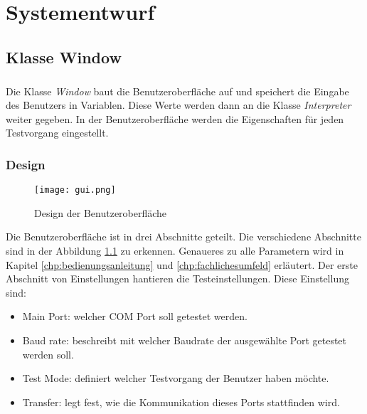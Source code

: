 \chapter{Systementwurf}\label{chp:systementwurf}

\section{Klasse Window}
\paragraph{}
Die Klasse \textit{Window} baut die Benutzeroberfläche auf und speichert die Eingabe des Benutzers in Variablen. Diese Werte werden dann an die Klasse \textit{Interpreter} weiter gegeben. In der Benutzeroberfläche werden die Eigenschaften für jeden Testvorgang eingestellt.


\subsection{Design}
\begin{figure}[h]
  \begin{center}
    \texttt{[image: gui.png]}
  		  \caption{Design der Benutzeroberfläche}
     \label{GUI_Bild}
  \end{center}
\end{figure}


Die Benutzeroberfläche ist in drei Abschnitte geteilt. Die verschiedene Abschnitte sind in der Abbildung \ref{GUI_Bild} zu erkennen. Genaueres zu alle Parametern wird in Kapitel \ref{chp:bedienungsanleitung} und  \ref{chp:fachlichesumfeld} erläutert. Der erste Abschnitt von Einstellungen hantieren die Testeinstellungen. Diese Einstellung sind:
\begin{itemize}
\item Main Port: welcher COM Port soll getestet werden.
\item Baud rate: beschreibt mit welcher Baudrate der ausgewählte Port getestet werden soll.
\item Test Mode: definiert welcher Testvorgang der Benutzer haben möchte.
\item Transfer: legt fest, wie die Kommunikation dieses Ports stattfinden wird.
\end{itemize}


